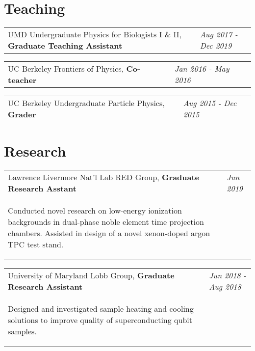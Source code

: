 \documentclass[
  10pt,
  letterpaper,
  DIV=11,
  numbers=noendperiod]{scrartcl}
\begin{document}
\hypertarget{fa-school-teaching}{%
\section{\texorpdfstring{
Teaching}{ Teaching}}\label{fa-school-teaching}}

\begin{tabularx}{\textwidth}{>{\RaggedRight}p{}  >{\RaggedLeft}X} UMD Undergraduate Physics for Biologists I \& II, \textbf{Graduate Teaching Assistant} & \textcolor{mygray}{\textit{Aug 2017 - Dec 2019}}  \end{tabularx}

\begin{tabularx}{\textwidth}{>{\RaggedRight}p{}  >{\RaggedLeft}X} UC Berkeley Frontiers of Physics, \textbf{Co-teacher} & \textcolor{mygray}{\textit{Jan 2016 - May 2016}}  \end{tabularx}

\begin{tabularx}{\textwidth}{>{\RaggedRight}p{}  >{\RaggedLeft}X} UC Berkeley Undergraduate Particle Physics, \textbf{Grader} & \textcolor{mygray}{\textit{Aug 2015 - Dec 2015}}  \end{tabularx}

\hypertarget{fa-atom-research}{%
\section{\texorpdfstring{
Research}{ Research}}\label{fa-atom-research}}

\begin{tabularx}{\textwidth}{>{\RaggedRight}p{}  >{\RaggedLeft}X} Lawrence Livermore Nat'l Lab RED Group, \textbf{Graduate Research Asstant} & \textcolor{mygray}{\textit{Jun 2019}} \\ \begin{quoting} \vspace{-0.7\baselineskip} Conducted novel research on low-energy ionization backgrounds in dual-phase noble element time projection chambers. Assisted in design of a novel xenon-doped argon TPC test stand. \vspace{-\baselineskip} \end{quoting} \end{tabularx}

\begin{tabularx}{\textwidth}{>{\RaggedRight}p{}  >{\RaggedLeft}X} University of Maryland Lobb Group, \textbf{Graduate Research Assistant} & \textcolor{mygray}{\textit{Jun 2018 - Aug 2018}} \\ \begin{quoting} \vspace{-0.7\baselineskip} Designed and investigated sample heating and cooling solutions to improve quality of superconducting qubit samples. \vspace{-\baselineskip} \end{quoting} \end{tabularx}
\end{document}
